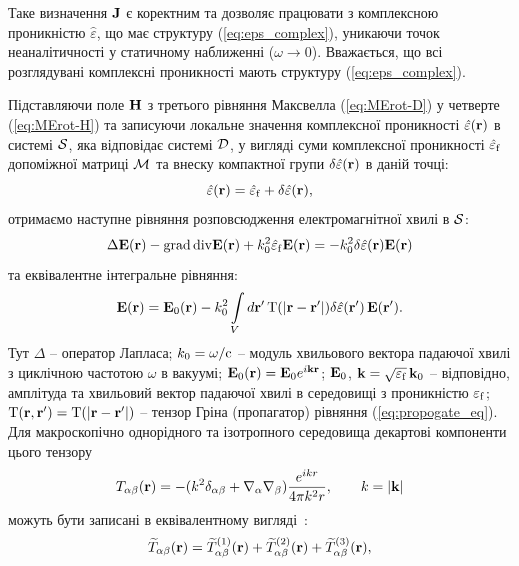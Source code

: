\documentclass[14pt,twoside]{vakthesis}
\begin{document}
Таке визначення $\bf J$ є коректним та дозволяє працювати з комплексною проникністю $\hat{\varepsilon}$, що має структуру (\ref{eq:eps_complex}), уникаючи точок неаналітичності у статичному наближенні ($\omega \to 0$). Вважається, що всі розглядувані комплексні проникності мають структуру (\ref{eq:eps_complex}).

Підставляючи поле ${\bf H}$ з третього рівняння Максвелла (\ref{eq:MErot-D}) у четверте (\ref{eq:MErot-H}) та записуючи локальне значення комплексної проникності $\hat{\varepsilon}({\bf r})$ в системі $\cal S$, яка відповідає системі $\cal D$, у вигляді суми комплексної проникності $\hat{\varepsilon}_{\rm f}$ допоміжної матриці $\cal M$ та внеску компактної групи $\delta\hat{\varepsilon}({\bf r})$ в даній точці:
$$
\hat{\varepsilon}({\bf r}) = \hat{\varepsilon}_{\rm f} + \delta\hat{\varepsilon}({\bf r}),
$$
отримаємо наступне рівняння розповсюдження електромагнітної хвилі в $\cal S$:
\begin{equation} \label{eq:propogate_eq}
\Delta {\bf E} ({\bf r}) - {\rm grad}\, {\rm div} {\bf E} ({\bf r}) + k_0^{2}\hat{\varepsilon}_{\rm f} {\bf E} ({\bf r})  = - k_{0}^{2} \delta
\hat{\varepsilon} ({\bf r}) {\bf E} ({\bf r})
\end{equation}
та еквівалентне інтегральне рівняння:
\begin{equation}\label{eq:integral_field}
{\bf E}({\rm {\bf r}}) = {\bf E}_{0} ({\bf r}) -
k_{0}^{2} \int\limits_{V} d{\bf r}'\, {\rm T}(|{\bf r} - {\bf r}'|)
\delta \hat{\varepsilon} ({\bf r}')\, {\bf E}({\bf r}').
\end{equation}
Тут $\Delta$ -- оператор Лапласа; $k_0 = \omega/{\rm c}$ -- модуль хвильового вектора падаючої хвилі з циклічною частотою $\omega$ в вакуумі; ${\bf E}_0 ({\bf r}) = {\bf E}_0 e^{i {\bf k}{\bf r}}$;
${\bf E}_0$, ${\bf k} = \sqrt{{\varepsilon}_{\rm f}}\,
{\bf k}_0$ -- відповідно, амплітуда та хвильовий вектор
падаючої хвилі в середовищі з проникністю ${\varepsilon}_{\rm f}$; 
${\rm T}({\bf r}, {\bf r}') = {\rm T}(|{\bf r} - {\bf r}'|)$ -- тензор Гріна (пропагатор) рівняння (\ref{eq:propogate_eq}). Для макроскопічно однорідного та ізотропного середовища декартові компоненти цього тензору 
\begin{equation}\label{eq:propogator-eps-origin}
	T_{\alpha\beta}({\rm {\bf r}}) = -(k^2\delta_{\alpha\beta} + \nabla_\alpha \nabla_\beta)\frac{e^{ikr}}{4\pi k^2r},\qquad k=|{\bf k}|
\end{equation}
можуть бути записані в еквівалентному вигляді~\cite{Ryzhov1965, Weighofer1989, Weiglhofer1995, Sushko2004}:
\begin{eqnarray}\label{eq:propagator-eps}
{\widetilde T}_{\alpha\beta} ({\rm {\bf r}})
= {\widetilde T}_{\alpha\beta}^{(1)} ({\rm {\bf r}}) + {\widetilde T}_{\alpha\beta}^{(2)} ({\rm {\bf r}}) + {\widetilde T}_{\alpha\beta}^{(3)} ({\rm {\bf r}}),
\end{eqnarray}
\end{document}
